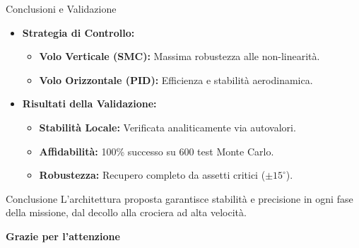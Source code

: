 \documentclass[aspectratio=169]{beamer} %
\begin{document}
\begin{frame}{Conclusioni e Validazione}
    \begin{itemize}
        \item \textbf{Strategia di Controllo:}
        \begin{itemize}
            \item \textbf{Volo Verticale (SMC):} Massima robustezza alle non-linearità.
            \item \textbf{Volo Orizzontale (PID):} Efficienza e stabilità aerodinamica.
        \end{itemize}

        \vspace{0.4cm}

        \item \textbf{Risultati della Validazione:}
        \begin{itemize}
            \item \textbf{Stabilità Locale:} Verificata analiticamente via autovalori.
            \item \textbf{Affidabilità:} 100\% successo su 600 test Monte Carlo.
            \item \textbf{Robustezza:} Recupero completo da assetti critici ($\pm 15^\circ$).
        \end{itemize}
    \end{itemize}

    \vspace{0.4cm}

    \begin{block}{Conclusione}
        L'architettura proposta garantisce stabilità e precisione in ogni fase della missione, dal decollo alla crociera ad alta velocità.
    \end{block}
\end{frame}


\begin{frame}
    \vfill
    \centering
    {\Huge \textbf{Grazie per l'attenzione}}
    \vfill
\end{frame}
\end{document}
